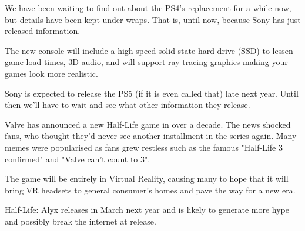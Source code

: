 \documentclass{article}
\begin{document}
\begin{multicols}{2}
We have been waiting to find out about the PS4's replacement for a while now, but details have been kept under wraps. That is, until now, because Sony has just released information.

The new console will include a high-speed solid-state hard drive (SSD) to lessen game load times, 3D audio, and will support ray-tracing graphics making your games look more realistic.

Sony is expected to release the PS5 (if it is even called that) late next year. Until then we'll have to wait and see what other information they release.


    Valve has announced a new Half-Life game in over a decade. The news shocked fans, who thought they'd never see another installment in the series again. Many memes were popularised as fans grew restless such as the famous "Half-Life 3 confirmed" and "Valve can't count to 3".
    
    The game will be entirely in Virtual Reality, causing many to hope that it will bring VR headsets to general consumer's homes and pave the way for a new era. 
    
    Half-Life: Alyx releases in March next year and is likely to generate more hype and possibly break the internet at release.


\end{multicols}
\closearticle
\end{document}
